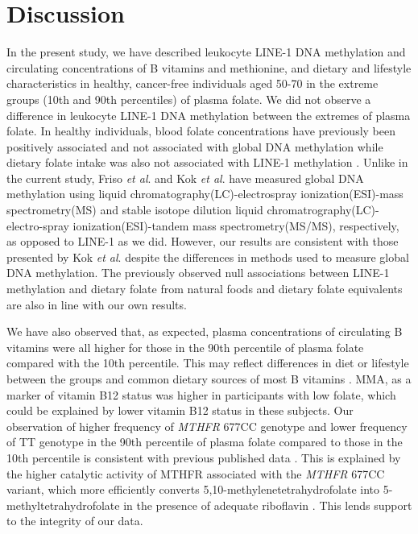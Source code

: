 \section{Discussion} %
\noindent In the present study, we have described leukocyte LINE-1 DNA methylation and circulating concentrations of B vitamins and methionine, and dietary and lifestyle characteristics in healthy, cancer-free individuals aged 50-70 in the extreme groups (10th and 90th percentiles) of plasma folate. We did not observe a difference in leukocyte LINE-1 DNA methylation between the extremes of plasma folate. In healthy individuals, blood folate concentrations have previously been positively associated \cite{c318} and not associated with global DNA methylation \cite{c319} while dietary folate intake was also not associated with LINE-1 methylation \cite{c317}. Unlike in the current study, Friso \emph{et al}. \cite{c318} and Kok \emph{et al}. \cite{c319} have measured global DNA methylation using liquid chromatography(LC)-electrospray ionization(ESI)-mass spectrometry(MS) and stable isotope dilution liquid chromatrography(LC)-electro-spray ionization(ESI)-tandem mass spectrometry(MS/MS), respectively, as opposed to LINE-1 as we did. However, our results are consistent with those presented by Kok \emph{et al}. despite the differences in methods used to measure global DNA methylation. The previously observed null associations between LINE-1 methylation and dietary folate from natural foods and dietary folate equivalents \cite{c317} are also in line with our own results.

\noindent We have also observed that, as expected, plasma concentrations of circulating B vitamins were all higher for those in the 90th percentile of plasma folate compared with the 10th percentile. This may reflect differences in diet or lifestyle between the groups and common dietary sources of most B vitamins \cite{c329}. MMA, as a marker of vitamin B12 status \cite{c330} was higher in participants with low folate, which could be explained by lower vitamin B12 status in these subjects. Our observation of higher frequency of \emph{MTHFR} 677CC genotype and lower frequency of TT genotype in the 90th percentile of plasma folate compared to those in the 10th percentile is consistent with previous published data \cite{c318}. This is explained by the higher catalytic activity of MTHFR associated with the \emph{MTHFR} 677CC variant, which more efficiently converts 5,10-methylenetetrahydrofolate into 5-methyltetrahydrofolate in the presence of adequate riboflavin \cite{c318}. This lends support to the integrity of our data.

